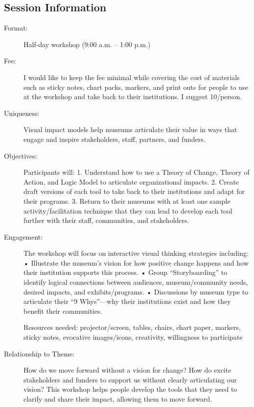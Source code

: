 \documentclass{report}
\begin{document}
              \subsection*{Session Information}
                \begin{description}
                  \item [Format:] Half-day workshop (9:00 a.m. – 1:00 p.m.)
							    
								  \item [Fee:]I would like to keep the fee minimal while covering the cost of materials such as sticky notes, chart packs, markers, and print outs for people to use at the workshop and take back to their institutions. I suggest 10/person. 
							     
							    \item [Uniqueness:]Visual impact models help museums articulate their value in ways that engage and inspire stakeholders, staff, partners, and funders.
							    \item [Objectives:]Participants will:
1. Understand how to use a Theory of Change, Theory of Action, and Logic Model to articulate organizational impacts.
2. Create draft versions of each tool to take back to their institutions and adapt for their programs.
3. Return to their museums with at least one sample activity/facilitation technique that they can lead to develop each tool further with their staff, communities, and stakeholders.
							    \item [Engagement:]The workshop will focus on interactive visual thinking strategies including:
•	Illustrate the museum’s vision for how positive change happens and how their institution supports this process.
•	Group “Storyboarding” to identify logical connections between audiences, museum/community needs, desired impacts, and exhibits/programs.
•	Discussions by museum type to articulate their “9 Whys”—why their institutions exist and how they benefit their communities.

Resources needed: projector/screen, tables, chairs, chart paper, markers, sticky notes, evocative images/icons, creativity, willingness to participate
							    \item [Relationship to Theme:]How do we move forward without a vision for change? How do excite stakeholders and funders to support us without clearly articulating our vision? This workshop helps people develop the tools that they need to clarify and share their impact, allowing them to move forward.
							    

\end{description}
\end{document}
